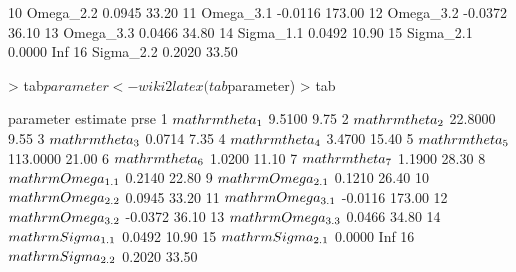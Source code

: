 \begin{Schunk}
\begin{Soutput}
10 Omega_2.2    0.0945  33.20
11 Omega_3.1   -0.0116 173.00
12 Omega_3.2   -0.0372  36.10
13 Omega_3.3    0.0466  34.80
14 Sigma_1.1    0.0492  10.90
15 Sigma_2.1    0.0000    Inf
16 Sigma_2.2    0.2020  33.50
\end{Soutput}
\begin{Sinput}
> tab$parameter <- wiki2latex(tab$parameter)
> tab
\end{Sinput}
\begin{Soutput}
                   parameter estimate   prse
1    $\\mathrm{\\theta_{1}}$   9.5100   9.75
2    $\\mathrm{\\theta_{2}}$  22.8000   9.55
3    $\\mathrm{\\theta_{3}}$   0.0714   7.35
4    $\\mathrm{\\theta_{4}}$   3.4700  15.40
5    $\\mathrm{\\theta_{5}}$ 113.0000  21.00
6    $\\mathrm{\\theta_{6}}$   1.0200  11.10
7    $\\mathrm{\\theta_{7}}$   1.1900  28.30
8  $\\mathrm{\\Omega_{1.1}}$   0.2140  22.80
9  $\\mathrm{\\Omega_{2.1}}$   0.1210  26.40
10 $\\mathrm{\\Omega_{2.2}}$   0.0945  33.20
11 $\\mathrm{\\Omega_{3.1}}$  -0.0116 173.00
12 $\\mathrm{\\Omega_{3.2}}$  -0.0372  36.10
13 $\\mathrm{\\Omega_{3.3}}$   0.0466  34.80
14 $\\mathrm{\\Sigma_{1.1}}$   0.0492  10.90
15 $\\mathrm{\\Sigma_{2.1}}$   0.0000    Inf
16 $\\mathrm{\\Sigma_{2.2}}$   0.2020  33.50
\end{Soutput}
\end{Schunk}
